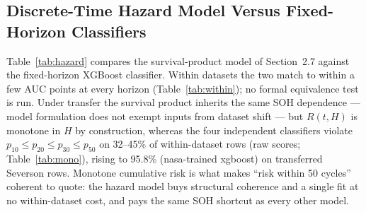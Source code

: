 \documentclass[preprint,12pt]{elsarticle}
\begin{document}
\begin{table}[!t]
\caption{Same-Chemistry Cross-Laboratory Controls at H=20 (XGBoost, Pooled AUC [CI]). Full Feature Sets Exercise the Zero-Imputation Confound; Common Sets Restrict Both Datasets to the Shared Four-Feature Subset.}
\label{tab:samechem}
\centering
{}
\end{table}

\subsection{Discrete-Time Hazard Model Versus Fixed-Horizon Classifiers}
Table~\ref{tab:hazard} compares the survival-product model of Section~2.7 against the fixed-horizon XGBoost classifier. Within datasets the two match to within a few AUC points at every horizon (Table~\ref{tab:within}); no formal equivalence test is run. Under transfer the survival product inherits the same SOH dependence --- model formulation does not exempt inputs from dataset shift --- but $R(t,H)$ is monotone in $H$ by construction, whereas the four independent classifiers violate $p_{10}\le p_{20}\le p_{30}\le p_{50}$ on 32--45\% of within-dataset rows (raw scores; Table~\ref{tab:mono}), rising to 95.8\% (nasa-trained xgboost) on transferred Severson rows. Monotone cumulative risk is what makes ``risk within 50 cycles'' coherent to quote: the hazard model buys structural coherence and a single fit at no within-dataset cost, and pays the same SOH shortcut as every other model.
\end{document}
